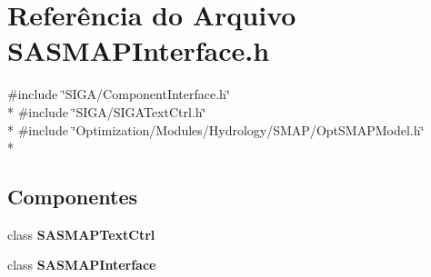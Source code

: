\section{Referência do Arquivo S\+A\+S\+M\+A\+P\+Interface.\+h}
\label{_s_a_s_m_a_p_interface_8h}
{\ttfamily \#include \char`\"{}S\+I\+G\+A/\+Component\+Interface.\+h\char`\"{}}\\*
{\ttfamily \#include \char`\"{}S\+I\+G\+A/\+S\+I\+G\+A\+Text\+Ctrl.\+h\char`\"{}}\\*
{\ttfamily \#include \char`\"{}Optimization/\+Modules/\+Hydrology/\+S\+M\+A\+P/\+Opt\+S\+M\+A\+P\+Model.\+h\char`\"{}}\\*
\subsection*{Componentes}
\begin{DoxyCompactItemize}
\item 
class {\bf S\+A\+S\+M\+A\+P\+Text\+Ctrl}
\item 
class {\bf S\+A\+S\+M\+A\+P\+Interface}
\end{DoxyCompactItemize}
